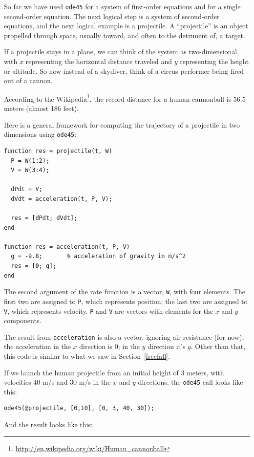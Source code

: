 \documentclass{book}
\begin{document}
So far we have used {\tt ode45} for a system of first-order
equations and for a single second-order equation. The next logical
step is a system of second-order equations, and the next logical example
is a projectile. A ``projectile'' is an object propelled
through space, usually toward, 
and often to the detriment of,
a target.

If a projectile stays in a plane, we can think of the system as
two-dimensional, with $x$ representing the horizontal distance
traveled and $y$ representing the height or altitude. So now
instead of a skydiver, think of a circus performer being fired
out of a cannon.

According to the
Wikipedia\footnote{\url{http://en.wikipedia.org/wiki/Human_cannonball}},
the record distance for a human cannonball is 56.5 meters (almost 186
feet).

Here is a general framework for computing the trajectory of a projectile
in two dimensions using {\tt ode45}:

\begin{verbatim}
function res = projectile(t, W)
  P = W(1:2);
  V = W(3:4);

  dPdt = V;             
  dVdt = acceleration(t, P, V);

  res = [dPdt; dVdt];
end

function res = acceleration(t, P, V)
  g = -9.8;       % acceleration of gravity in m/s^2
  res = [0; g];
end
\end{verbatim}

The second argument of the rate function is a vector, {\tt W}, with
four elements. The first two are assigned to {\tt P}, which
represents position; the last two are assigned to {\tt V}, which
represents velocity.
{\tt P} and {\tt V} are vectors with
elements for the $x$ and $y$ components.

The result from
{\tt acceleration} is also a vector; ignoring air resistance
(for now), the acceleration in the $x$ direction is 0; in
the $y$ direction it's $g$.
Other than that, this code is similar to what we saw in
Section~\ref{freefall}.

If we launch the human projectile from an initial height of
3 meters, with velocities 40 m/s and 30 m/s in the $x$ and $y$
directions, the {\tt ode45} call looks like
this:

\begin{verbatim}
ode45(@projectile, [0,10], [0, 3, 40, 30]);
\end{verbatim}

And the result looks like this:
\end{document}
